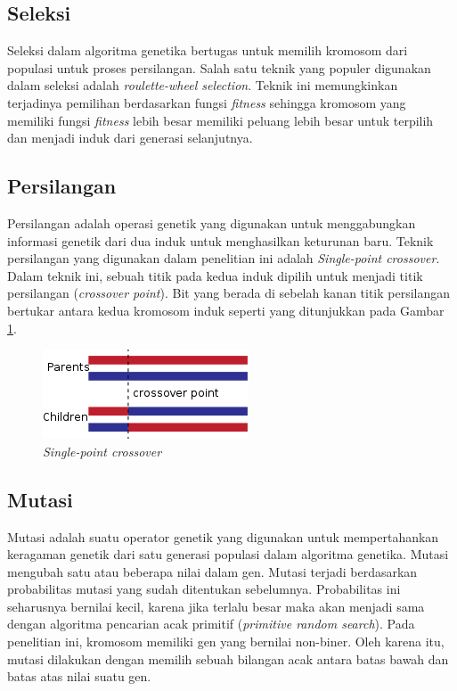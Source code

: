 \documentclass[a4paper,twoside]{article}
\begin{document}
\begin{enumerate}
\subsection*{Seleksi}
\label{sub:selection}
Seleksi dalam algoritma genetika bertugas untuk memilih kromosom dari populasi untuk proses persilangan. Salah satu teknik yang populer digunakan dalam seleksi adalah \textit{roulette-wheel selection}. Teknik ini memungkinkan terjadinya pemilihan berdasarkan fungsi \textit{fitness} sehingga kromosom yang memiliki fungsi \textit{fitness} lebih besar memiliki peluang lebih besar untuk terpilih dan menjadi induk dari generasi selanjutnya.

\subsection*{Persilangan}
\label{sub:crossover}
Persilangan adalah operasi genetik yang digunakan untuk menggabungkan informasi genetik dari dua induk untuk menghasilkan keturunan baru. Teknik persilangan yang digunakan dalam penelitian ini adalah \textit{Single-point crossover}. Dalam teknik ini, sebuah titik pada kedua induk dipilih untuk menjadi titik persilangan (\textit{crossover point}). Bit yang berada di sebelah kanan titik persilangan bertukar antara kedua kromosom induk seperti yang ditunjukkan pada Gambar \ref{fig:spcrossover}.

\begin{figure}[h]
	\begin{center}
		\includegraphics{OnePointCrossover}
		\caption{\textit{Single-point crossover}}
		\label{fig:spcrossover}
	\end{center}
\end{figure}

\subsection*{Mutasi}
\label{sub:mutation}
Mutasi adalah suatu operator genetik yang digunakan untuk mempertahankan keragaman genetik dari satu generasi populasi dalam algoritma genetika. Mutasi mengubah satu atau beberapa nilai dalam gen. Mutasi terjadi berdasarkan probabilitas mutasi yang sudah ditentukan sebelumnya. Probabilitas ini seharusnya bernilai kecil, karena jika terlalu besar maka akan menjadi sama dengan algoritma pencarian acak primitif (\textit{primitive random search}). Pada penelitian ini, kromosom memiliki gen yang bernilai non-biner. Oleh karena itu, mutasi dilakukan dengan memilih sebuah bilangan acak antara batas bawah dan batas atas nilai suatu gen.


\end{enumerate}
\end{document}
